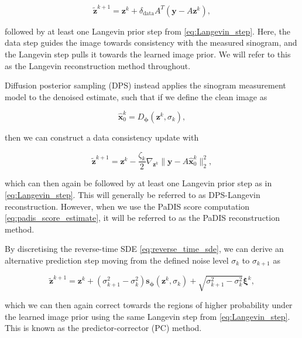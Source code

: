 \begin{equation}
\tilde{\mathbf{z}}^{k+1}
=
\mathbf{z}^k
+
\delta_{\mathrm{data}}
A^T(\mathbf{y}-A\mathbf{z}^k),
\label{eq:langevin_data_update}
\end{equation}

followed by at least one Langevin prior step from \eqref{eq:Langevin_step}. Here, the data step guides the image towards consistency with the measured sinogram, and the Langevin step pulls it towards the learned image prior. We will refer to this as the Langevin reconstruction method throughout.

Diffusion posterior sampling (DPS) instead applies the sinogram measurement model to the denoised estimate, such that if we define the clean image as

\begin{equation}
\hat{\mathbf{x}}_0^k
=
D_{\boldsymbol{\phi}}(\mathbf{z}^k,\sigma_k),
\label{eq:dps_clean_estimate}
\end{equation}

then we can construct a data consistency update with

\begin{equation}
\tilde{\mathbf{z}}^{k+1}
=
\mathbf{z}^k
-
\frac{\zeta_k}{2}
\nabla_{\mathbf{z}^k}
\|\mathbf{y}-A\hat{\mathbf{x}}_0^k\|_2^2,
\label{eq:dps_data_update}
\end{equation}

which can then again be followed by at least one Langevin prior step as in \eqref{eq:Langevin_step}. This will generally be referred to as DPS-Langevin reconstruction. However, when we use the PaDIS score computation \autoref{eq:padis_score_estimate}, it will be referred to as the PaDIS reconstruction method.

By discretising the reverse-time SDE \eqref{eq:reverse_time_sde}, we can derive an alternative prediction step moving from the defined noise level $\sigma_k$ to $\sigma_{k+1}$ as

\begin{equation}
\tilde{\mathbf{z}}^{k+1}
=
\mathbf{z}^k
+
(\sigma_{k+1}^2-\sigma_k^2)
\mathbf{s}_{\boldsymbol{\phi}}(\mathbf{z}^k,\sigma_k)
+
\sqrt{\sigma_{k+1}^2-\sigma_k^2}\boldsymbol{\xi}^k,
\label{eq:pc_predictor_step}
\end{equation}

which we can then again correct towards the regions of higher probability under the learned image prior using the same Langevin step from \eqref{eq:Langevin_step}. This is known as the predictor-corrector (PC) method.

